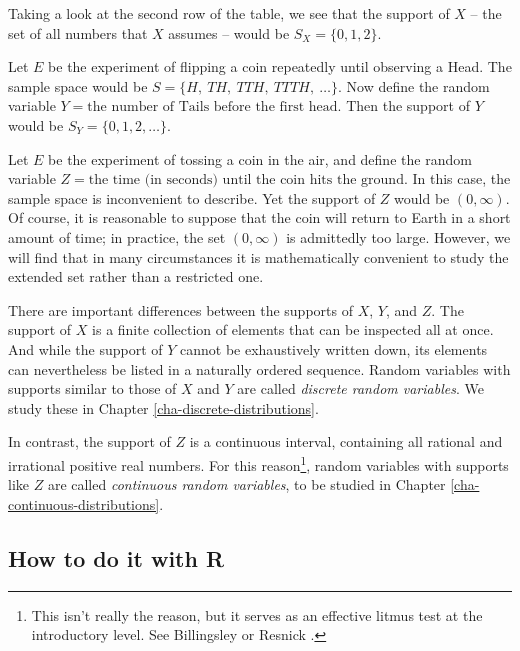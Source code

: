 \documentclass[]{book}
\let\rmarkdownfootnote\footnote%
\def\footnote{\protect\rmarkdownfootnote}
\numberwithin{equation}{chapter}
\numberwithin{figure}{chapter}
\theoremstyle{plain}
\theoremstyle{definition}
\theoremstyle{remark}
\theoremstyle{definition}
\theoremstyle{definition}
\theoremstyle{remark}
\let\BeginKnitrBlock\begin \let\EndKnitrBlock\end
\begin{document}
Taking a look at the second row of the table, we see that the support of
\(X\) -- the set of all numbers that \(X\) assumes -- would be
\(S_{X}= \{ 0,1,2 \}\).

\bigskip

\BeginKnitrBlock{example}
\protect\hypertarget{ex:unnamed-chunk-186}{}{\label{ex:unnamed-chunk-186}}Let
\(E\) be the experiment of flipping a coin repeatedly until observing a
Head. The sample space would be \(S= \{ H,\ TH,\ TTH,\
TTTH,\ \ldots \}\). Now define the random variable
\(Y=\mbox{the number of Tails before the first head}\). Then the support
of \(Y\) would be \(S_{Y}= \{ 0,1,2,\ldots \}\).
\EndKnitrBlock{example}

\bigskip

\BeginKnitrBlock{example}
\protect\hypertarget{ex:unnamed-chunk-187}{}{\label{ex:unnamed-chunk-187}}Let
\(E\) be the experiment of tossing a coin in the air, and define the
random variable
\(Z = \mbox{the time (in seconds) until the coin hits the ground}\). In
this case, the sample space is inconvenient to describe. Yet the support
of \(Z\) would be \((0,\infty)\). Of course, it is reasonable to suppose
that the coin will return to Earth in a short amount of time; in
practice, the set \((0,\infty)\) is admittedly too large. However, we
will find that in many circumstances it is mathematically convenient to
study the extended set rather than a restricted one.
\EndKnitrBlock{example}

There are important differences between the supports of \(X\), \(Y\),
and \(Z\). The support of \(X\) is a finite collection of elements that
can be inspected all at once. And while the support of \(Y\) cannot be
exhaustively written down, its elements can nevertheless be listed in a
naturally ordered sequence. Random variables with supports similar to
those of \(X\) and \(Y\) are called \emph{discrete random variables}. We
study these in Chapter \ref{cha-discrete-distributions}.

In contrast, the support of \(Z\) is a continuous interval, containing
all rational and irrational positive real numbers. For this
reason\footnote{This isn't really the reason, but it serves as an
  effective litmus test at the introductory level. See Billingsley
  \autocite{Billingsley1995} or Resnick \autocite{Resnick1999}.}, random
variables with supports like \(Z\) are called \emph{continuous random
variables}, to be studied in Chapter \ref{cha-continuous-distributions}.

\subsection{How to do it with R}\label{how-to-do-it-with-r-19}
\end{document}
